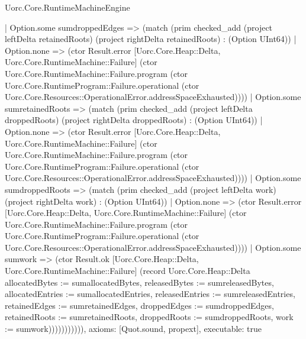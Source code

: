 \begin{lexlean}{Uorc.Core.RuntimeMachineEngine}
\begin{semanticmodule}
{              | Option.some sumdroppedEdges => (match (prim checked_add (project leftDelta retainedRoots) (project rightDelta retainedRoots) : (Option UInt64))
                | Option.none => (ctor Result.error [Uorc.Core.Heap::Delta, Uorc.Core.RuntimeMachine::Failure] (ctor Uorc.Core.RuntimeMachine::Failure.program (ctor Uorc.Core.RuntimeProgram::Failure.operational (ctor Uorc.Core.Resources::OperationalError.addressSpaceExhausted))))
                | Option.some sumretainedRoots => (match (prim checked_add (project leftDelta droppedRoots) (project rightDelta droppedRoots) : (Option UInt64))
                  | Option.none => (ctor Result.error [Uorc.Core.Heap::Delta, Uorc.Core.RuntimeMachine::Failure] (ctor Uorc.Core.RuntimeMachine::Failure.program (ctor Uorc.Core.RuntimeProgram::Failure.operational (ctor Uorc.Core.Resources::OperationalError.addressSpaceExhausted))))
                  | Option.some sumdroppedRoots => (match (prim checked_add (project leftDelta work) (project rightDelta work) : (Option UInt64))
                    | Option.none => (ctor Result.error [Uorc.Core.Heap::Delta, Uorc.Core.RuntimeMachine::Failure] (ctor Uorc.Core.RuntimeMachine::Failure.program (ctor Uorc.Core.RuntimeProgram::Failure.operational (ctor Uorc.Core.Resources::OperationalError.addressSpaceExhausted))))
                    | Option.some sumwork => (ctor Result.ok [Uorc.Core.Heap::Delta, Uorc.Core.RuntimeMachine::Failure] (record Uorc.Core.Heap::Delta {allocatedBytes := sumallocatedBytes, releasedBytes := sumreleasedBytes, allocatedEntries := sumallocatedEntries, releasedEntries := sumreleasedEntries, retainedEdges := sumretainedEdges, droppedEdges := sumdroppedEdges, retainedRoots := sumretainedRoots, droppedRoots := sumdroppedRoots, work := sumwork}))))))))))),
  axioms: [Quot.sound, propext],
  executable: true
}


\end{semanticmodule}
\end{lexlean}
